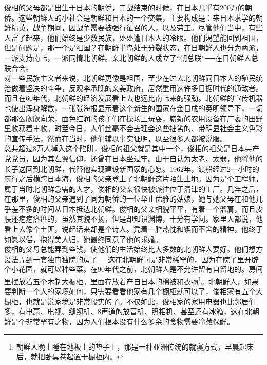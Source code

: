 \begin{multicols}{\theparacolNo}
俊相的父母都是出生于日本的朝侨，二战结束的时候，在日本几乎有200万的朝侨。这些朝鲜人的小社会是朝鲜和日本的一个交集，主要构成是：来日本求学的朝鲜精英，战争期间，因战争需要被强行征召的人，以及劳工。尽管他们当中，有些人富了起来，他们始终是少数民族，处处遭日本人的冷眼。他们渴望能回到祖国，但是问题是，那一个是祖国？在朝鲜半岛处于分裂状态，在日朝鲜人也分为两派，一派支持南韩，一派同情北朝鲜。亲北朝鲜的人成立了“朝总联”──在日朝鲜人总联合会。\\

对一些民族主义者来说，北朝鲜更像是祖国，至少在过去北朝鲜同日本人的殖民统治做着坚决的斗争，反观李承晚的亲美政府，居然重用这许多日据时代的通敌者。而且在60年代，北朝鲜的经济发展看上去也远比南韩来的强劲。北朝鲜的宣传机器也使出浑身解数，一张张海报显示着这个新生的国家在金日成的英明领导下，一切都那么欣欣向荣，面色红润的孩子们在操场上玩耍，崭新的农用设备在广袤的田野里收获着丰收。时至今日，人们丝毫不会去理会这些拙劣的、带明显社会主义色彩的宣传手法，然而在当时，他们辅以事实证明，以至很多人都被说服。\\

总共超过8万人掉入这个陷阱，俊相的祖父就是其中一个，俊相的祖父是日本共产党党员，因为其左翼信仰，还曾在日本坐过牢。由于自认为太老、太弱，他将他的长子送回到北朝鲜，代替他实现建设新国家的心愿。1962年，渡船经过2一小时的航行之后横跨日本海，俊相的父亲登上了北朝鲜这片陌生土地。因为是个工程师，属于当时北朝鲜急需的人才，俊相的父亲很快被派往位于清津的工厂。几年之后，在那里，俊相的父亲遇到了同为朝侨的一位举止优雅的姑娘，她与她父母在和他几乎差不多的时间从日本抵达北朝鲜。俊相的父亲相貌平平，有着一个溜肩，而且皮肤还疙疙瘩瘩的，虽然其貌不扬，但是却知识渊博，十分有学问。家里人都说，他看上去像个土匪，说起话来却是个诗人。凭着一腔热忱和锲而不舍的精神，他终于如愿以偿，抱得美人归，她最终同意了他的求婚。\\

俊相的父母总能弄到些钱，使他们的生活始终比大多数的北朝鲜人要好。他们想方设法弄到一套独门独院的房子──这在北朝鲜可是非常稀罕的，因为在院子里开辟个小花园，就可以种些菜。在90年代之前，北朝鲜人是不允许留有自留地的。房间里摆放着五个木制大橱柜。里面存放着产自日本的棉被和衣物\footnote{朝鲜人晚上睡在地板上的垫子上，那是一种亚洲传统的就寝方式，早晨起床后，就把卧具卷起置于橱柜内。}。北朝鲜人，如果要判断一个人的家境如何，只需要看看他家有几个橱柜就可以了，俊相家有五个大橱柜，也就是说家境是非常殷实的了。不仅如此，俊相家的家用电器也比邻居们多，有电扇、电视、缝纫机、8声道的放音机、照相机、甚至还有冰箱，这在北朝鲜是个非常罕有之物，因为人们根本没有什么多余的食物需要冷藏保鲜。\\


\end{multicols}
